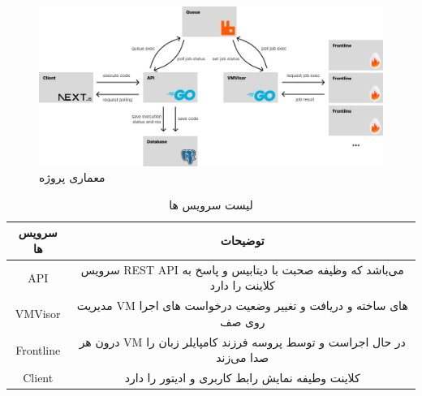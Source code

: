 \begin{figure}[hb]
    \centering
    \includegraphics[width=1\textwidth]{./3-Design/design.jpg}
    \caption{معماری پروژه}
    \label{fig:architecture}
\end{figure}

\begin{table}[hb]
    \centering
    \caption{لیست سرویس ها}
    \label{table:services}
    \begin{tabular}{|c|c|}
        \hline
        سرویس ها  & توضیحات                                                                 \\
        \hline

        API       & سرویس REST API می‌باشد که وظیفه صحبت با دیتابیس و پاسخ به کلاینت را دارد \\
        \hline

        VMVisor   & مدیریت VM های ساخته و دریافت و تغییر وضعیت درخواست های اجرا روی صف      \\
        \hline

        Frontline & درون هر VM در حال اجراست و توسط پروسه فرزند کامپایلر زبان را صدا می‌زند  \\
        \hline


        Client    & کلاینت وطیفه نمایش رابط کاربری و ادیتور را دارد                         \\
        \hline
    \end{tabular}
\end{table}